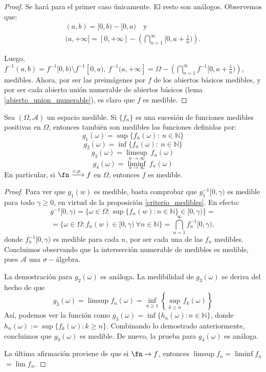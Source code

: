 \begin{proof}
Se hará para el primer caso únicamente. El resto son análogos. Observemos que:
\[
	\begin{array}{l}
	\left( a,b \right) = [0,b) - [0,a)\quad \text{y}\\
	(a,+\infty] = [0,+\infty] - \left(\bigcap_{n=1}^\infty[0,a+\frac{1}{n})\right).
	\end{array}
\] 

Luego, $f^{-1}(a,b) = f^{-1}[0,b)\setminus f^{-1}[0,a),\ f^{-1}(a,+\infty] = \Omega - \left(\bigcap_{n=1}^\infty f^{-1}[0,a+\frac{1}{n})\right)$, medibles.
Ahora, por ser las preimágenes por $f$ de los abiertos básicos medibles, y por ser cada abierto unión numerable de abiertos básicos (lema \ref{abierto_union_numerable}),
es claro que $f$ es medible.
\end{proof}

\begin{nprop} \label {p1}
  Sea $(\Omega,\mathscr A)$ un espacio medible. Si $\{f_n\}$ es una sucesión de funciones medibles positivas en $\Omega$, entonces también son medibles las funciones definidas por:
  \[
    g_1(\omega) =  \sup\{f_n(\omega) : \ n \in \mathbb{N} \}
  \]
  \[
    g_2(\omega) =  \inf\{f_n(\omega) : \ n \in \mathbb{N} \}
  \]
  \[
    g_3(\omega) = \limsup_{n\to \infty} \ f_n(\omega)
  \]
  \[
    g_4(\omega) = \liminf_{n\to \infty}  \ f_n(\omega)
  \]
  En particular, si $\fn \xrightarrow{c.p.} f$ en $\Omega$, entonces $f$ es medible.
\end{nprop}

  \begin{proof}
	Para ver que $g_1(w)$ es medible, basta comprobar que $g_{1}^{-1}[0,\gamma)$ es medible para todo $\gamma \ge 0$, en virtud de la proposición \ref{criterio_medibles}. En efecto: $$g^{-1}[0,\gamma) = \{\omega \in \Omega : \sup\{f_n(w) : n \in \mathbb{N}\} \in [0,\gamma)\} =$$  $$ = \{ \omega \in \Omega : f_n(w) \in [0,\gamma) \ \forall n \in \mathbb{N}\} = \bigcap_{n=1}^{\infty} f_n^{-1}[0,\gamma), $$ donde $f_n^{-1}[0,\gamma)$ es medible para cada $n$, por ser cada una de las $f_n$ medibles. Concluimos observando que la intersección numerable de medibles es medible, pues $\mathscr A$ una $\sigma-$álgebra.

	La demostración para $g_2(\omega)$ es análoga. La medibilidad de $g_3(\omega)$ se deriva del hecho de que $$g_3(\omega) = \limsup f_n(\omega) = \inf_{n \ge 1} \left\{\sup_{k\ge n} f_k(\omega) \right\}$$ Así, podemos ver la función como $g_3(\omega) = \inf \{h_n(\omega) : n \in \mathbb{N}\}$, donde $h_n(\omega) := \sup \{f_k(\omega) : k \ge n\}$. Combinando lo demostrado anteriormente, concluimos que $g_3(\omega)$ es medible. De nuevo, la prueba para $g_4(\omega)$ es análoga.

La última afirmación proviene de que si $\fn \to f$, entonces $\limsup f_n = \liminf f_n$ $=\lim f_n$.
\end{proof}


